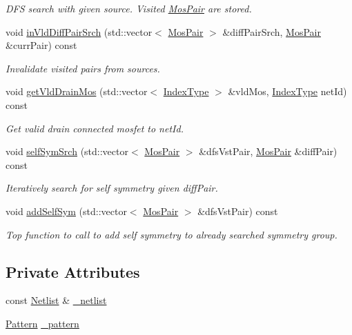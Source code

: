 \begin{DoxyCompactItemize}
\begin{DoxyCompactList}\small\item\em D\+FS search with given source. Visited \hyperlink{classMosPair}{Mos\+Pair} are stored. \end{DoxyCompactList}\item 
void \hyperlink{classSymDetect_ae6a1ba27f6768f215cba0623b6e2ce08}{in\+Vld\+Diff\+Pair\+Srch} (std\+::vector$<$ \hyperlink{classMosPair}{Mos\+Pair} $>$ \&diff\+Pair\+Srch, \hyperlink{classMosPair}{Mos\+Pair} \&curr\+Pair) const
\begin{DoxyCompactList}\small\item\em Invalidate visited pairs from sources. \end{DoxyCompactList}\item 
void \hyperlink{classSymDetect_a48c23173bf5e56c3aa11ac306715cba2}{get\+Vld\+Drain\+Mos} (std\+::vector$<$ \hyperlink{type_8h_a581e8093e28e7362f2b6937296190676}{Index\+Type} $>$ \&vld\+Mos, \hyperlink{type_8h_a581e8093e28e7362f2b6937296190676}{Index\+Type} net\+Id) const
\begin{DoxyCompactList}\small\item\em Get valid drain connected mosfet to net\+Id. \end{DoxyCompactList}\item 
void \hyperlink{classSymDetect_ab6f286024b013fa257295111016da18b}{self\+Sym\+Srch} (std\+::vector$<$ \hyperlink{classMosPair}{Mos\+Pair} $>$ \&dfs\+Vst\+Pair, \hyperlink{classMosPair}{Mos\+Pair} \&diff\+Pair) const
\begin{DoxyCompactList}\small\item\em Iteratively search for self symmetry given diff\+Pair. \end{DoxyCompactList}\item 
void \hyperlink{classSymDetect_ac3075fde17fa6c33093a683b18f17086}{add\+Self\+Sym} (std\+::vector$<$ \hyperlink{classMosPair}{Mos\+Pair} $>$ \&dfs\+Vst\+Pair) const
\begin{DoxyCompactList}\small\item\em Top function to call to add self symmetry to already searched symmetry group. \end{DoxyCompactList}\end{DoxyCompactItemize}
\subsection*{Private Attributes}
\begin{DoxyCompactItemize}
\item 
const \hyperlink{classNetlist}{Netlist} \& \hyperlink{classSymDetect_aaa007c5c446ad65879c91e258542c9f3}{\+\_\+netlist}
\item 
\hyperlink{classPattern}{Pattern} \hyperlink{classSymDetect_a77937a3591871874553ea30e7d78fc2e}{\+\_\+pattern}
\end{DoxyCompactItemize}


